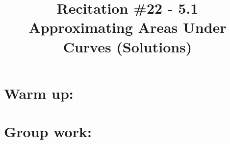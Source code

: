 \documentclass[nooutcomes]{ximera}
\title{Recitation \#22 - 5.1 Approximating Areas Under Curves (Solutions)}
\begin{document}
\begin{abstract}		\end{abstract}
\maketitle

\section*{Warm up:} 

		\begin{freeResponse}
		
		\end{freeResponse}	
		
		
		

	
	
	
	
	

\section*{Group work:}



\begin{problem}

		\begin{freeResponse}
		
		\end{freeResponse}
		
		
\end{problem}
















\begin{problem}

		\begin{freeResponse}
		
		\end{freeResponse}
		
		
		

\end{problem}
	
	
	
	
	
	
	
	
			
			

\begin{problem}

		\begin{freeResponse}
			
		\end{freeResponse}
			
			
		
\end{problem}
\end{document}
